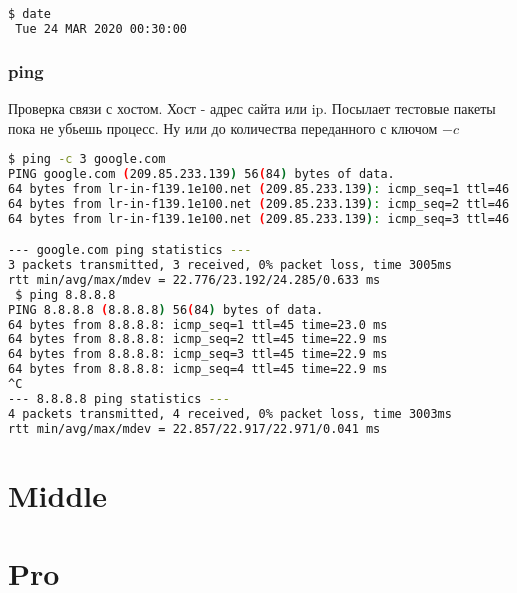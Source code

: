 \documentclass[11pt]{article}
\begin{document}
\begin{lstlisting}[language=bash]
 $ date
 Tue 24 MAR 2020 00:30:00
\end{lstlisting}

\subsubsection*{ping}
Проверка связи с хостом. Хост - адрес сайта или ip. Посылает тестовые пакеты пока не убьешь процесс. Ну или до количества переданного с ключом $-c$
\begin{lstlisting}[language=bash]
 $ ping -c 3 google.com
PING google.com (209.85.233.139) 56(84) bytes of data.
64 bytes from lr-in-f139.1e100.net (209.85.233.139): icmp_seq=1 ttl=46 time=22.8 ms
64 bytes from lr-in-f139.1e100.net (209.85.233.139): icmp_seq=2 ttl=46 time=24.3 ms
64 bytes from lr-in-f139.1e100.net (209.85.233.139): icmp_seq=3 ttl=46 time=22.8 ms

--- google.com ping statistics ---
3 packets transmitted, 3 received, 0% packet loss, time 3005ms
rtt min/avg/max/mdev = 22.776/23.192/24.285/0.633 ms
 $ ping 8.8.8.8
PING 8.8.8.8 (8.8.8.8) 56(84) bytes of data.
64 bytes from 8.8.8.8: icmp_seq=1 ttl=45 time=23.0 ms
64 bytes from 8.8.8.8: icmp_seq=2 ttl=45 time=22.9 ms
64 bytes from 8.8.8.8: icmp_seq=3 ttl=45 time=22.9 ms
64 bytes from 8.8.8.8: icmp_seq=4 ttl=45 time=22.9 ms
^C
--- 8.8.8.8 ping statistics ---
4 packets transmitted, 4 received, 0% packet loss, time 3003ms
rtt min/avg/max/mdev = 22.857/22.917/22.971/0.041 ms

\end{lstlisting}


\section*{Middle}
\section*{Pro}
\end{document}
